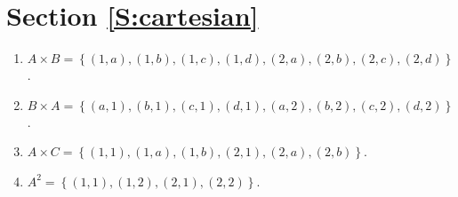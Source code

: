 \section*{Section \ref{S:cartesian}}
\renewcommand{\labelenumi}{(\textbf{\alph{enumi}})}

\begin{list}{\bf{\ref{exer:sec44-1}.}}
%
%
\item \begin{enumerate}
\item $A \times B = \left\{ {\left( {1, a} \right), \left( {1, b} \right), \left( {1, c} \right), \left( {1, d} \right), \left( {2, a} \right), \left( {2, b} \right), \left( {2, c} \right), \left( {2, d} \right)} \right\}$.

\item $B \times A = \left\{ {\left( {a, 1} \right), \left( {b, 1} \right), \left( {c, 1} \right), \left( {d, 1} \right), \left( {a, 2} \right), \left( {b, 2} \right), \left( {c, 2} \right), \left( {d, 2} \right)} \right\}$.

\item $A \times C = \left\{ { \left( 1, 1 \right), \left( {1, a} \right), \left( {1, b} \right), \left( 2, 1 \right), \left( {2, a} \right), \left( {2, b} \right)} \right\}$.

\item $A^2 = \left\{ \left( 1, 1 \right), \left( 1, 2 \right), \left( 2, 1 \right), \left( 2, 2 \right) \right\}$.


\end{enumerate}
\end{list}
